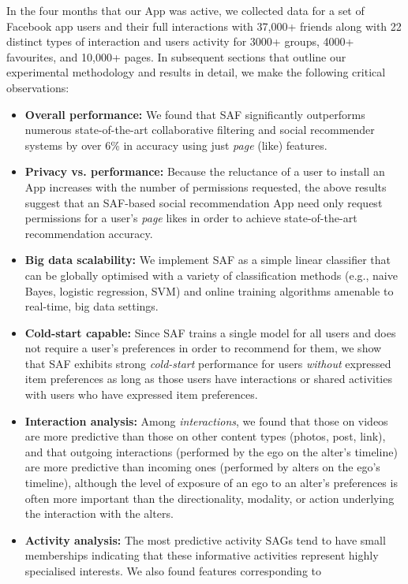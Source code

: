 In the four months that our App was active, we collected data for a
set of Facebook app users and their full interactions with 37,000+
friends along with 22 distinct types of interaction and users activity
for 3000+ groups, 4000+ favourites, and 10,000+ pages.  In subsequent
sections that outline our experimental methodology and results in
detail, we make the following critical observations:
\begin{itemize}
\item {\bf Overall performance:} We found that SAF significantly 
outperforms numerous state-of-the-art collaborative filtering and
social recommender systems by over 6\% in accuracy using
just \emph{page} (like) features.  
\item {\bf Privacy vs. performance:} 
Because the reluctance of a user to install an App increases with the
number of permissions requested, the above results suggest that an
SAF-based social recommendation App need only request permissions for
a user's \emph{page} likes in order to achieve state-of-the-art
recommendation accuracy.
\item {\bf Big data scalability:} We implement SAF as 
a simple linear classifier that can be globally optimised
with a variety of classification methods (e.g., naive
Bayes, logistic regression, SVM) and online training algorithms
amenable to real-time, big data settings.
\item {\bf Cold-start capable:}
Since SAF trains a single model for all users and does not 
require a user's preferences in order to recommend for them,
we show that SAF exhibits strong \emph{cold-start}
performance for users \emph{without} expressed item preferences as long as those users
have interactions or shared activities with users who have
expressed item preferences.
\item {\bf Interaction analysis:} 
Among \emph{interactions}, we found that those on videos are more
predictive than those on other content types (photos, post, link), and
that outgoing interactions (performed by the ego on the alter's
timeline) are more predictive than incoming ones (performed by alters
on the ego's timeline), although the level of exposure of an ego to an
alter's preferences is often more important than the directionality,
modality, or action underlying the interaction with the alters.
\item {\bf Activity analysis:}
The most predictive activity SAGs tend to have small memberships
indicating that these informative activities represent highly
specialised interests.  We also found features corresponding to

\end{itemize}

